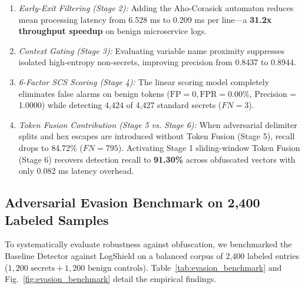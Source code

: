 \documentclass[conference]{IEEEtran}
\begin{document}
\begin{enumerate}
    \item \textit{Early-Exit Filtering (Stage 2):} Adding the Aho-Corasick automaton reduces mean processing latency from 6.528 ms to 0.209 ms per line—a \textbf{31.2x throughput speedup} on benign microservice logs.
    \item \textit{Context Gating (Stage 3):} Evaluating variable name proximity suppresses isolated high-entropy non-secrets, improving precision from 0.8437 to 0.8944.
    \item \textit{6-Factor SCS Scoring (Stage 4):} The linear scoring model completely eliminates false alarms on benign tokens ($\text{FP}=0, \text{FPR}=0.00\%$, Precision = 1.0000) while detecting 4,424 of 4,427 standard secrets ($FN=3$).
    \item \textit{Token Fusion Contribution (Stage 5 vs. Stage 6):} When adversarial delimiter splits and hex escapes are introduced without Token Fusion (Stage 5), recall drops to 84.72\% ($FN=795$). Activating Stage 1 sliding-window Token Fusion (Stage 6) recovers detection recall to \textbf{91.30\%} across obfuscated vectors with only 0.082 ms latency overhead.
\end{enumerate}

\subsection{Adversarial Evasion Benchmark on 2,400 Labeled Samples}\label{sec:evasion}
To systematically evaluate robustness against obfuscation, we benchmarked the Baseline Detector against LogShield on a balanced corpus of 2,400 labeled entries ($1,200\text{ secrets} + 1,200\text{ benign controls}$). Table~\ref{tab:evasion_benchmark} and Fig.~\ref{fig:evasion_benchmark} detail the empirical findings.
\end{document}
